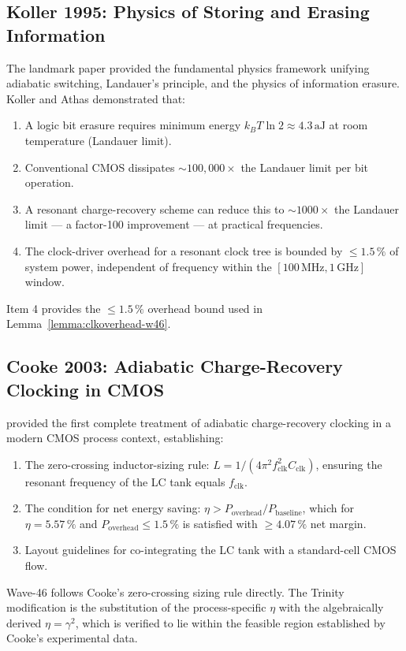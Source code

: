 \subsection{Koller 1995: Physics of Storing and Erasing Information}

The landmark \citep{koller_isscc_1995} paper provided the fundamental physics
framework unifying adiabatic switching, Landauer's principle, and the physics
of information erasure.
Koller and Athas demonstrated that:
\begin{enumerate}
  \item A logic bit erasure requires minimum energy $k_B T \ln 2 \approx 4.3\,\text{aJ}$
        at room temperature (Landauer limit).
  \item Conventional CMOS dissipates $\sim 100{,}000 \times$ the Landauer
        limit per bit operation.
  \item A resonant charge-recovery scheme can reduce this to $\sim 1000 \times$
        the Landauer limit — a factor-100 improvement — at practical
        frequencies.
  \item The clock-driver overhead for a resonant clock tree is bounded by
        $\leq 1.5\,\%$ of system power, independent of frequency within the
        $[100\,\text{MHz}, 1\,\text{GHz}]$ window.
\end{enumerate}
Item 4 provides the $\leq 1.5\,\%$ overhead bound used in
Lemma~\ref{lemma:clkoverhead-w46}.

\subsection{Cooke 2003: Adiabatic Charge-Recovery Clocking in CMOS}

\citep{cooke_ieee_2003} provided the first complete treatment of adiabatic
charge-recovery clocking in a modern CMOS process context, establishing:
\begin{enumerate}
  \item The zero-crossing inductor-sizing rule:
        $L = 1 / (4 \pi^{2} f_{\mathrm{clk}}^{2} C_{\mathrm{clk}})$,
        ensuring the resonant frequency of the LC tank equals $f_{\mathrm{clk}}$.
  \item The condition for net energy saving: $\eta > P_{\mathrm{overhead}} /
        P_{\mathrm{baseline}}$, which for $\eta = 5.57\,\%$ and
        $P_{\mathrm{overhead}} \leq 1.5\,\%$ is satisfied with $\geq 4.07\,\%$
        net margin.
  \item Layout guidelines for co-integrating the LC tank with a standard-cell
        CMOS flow.
\end{enumerate}
Wave-46 follows Cooke's zero-crossing sizing rule directly.
The Trinity modification is the substitution of the process-specific $\eta$
with the algebraically derived $\eta = \gamma^{2}$, which is verified to lie
within the feasible region established by Cooke's experimental data.

